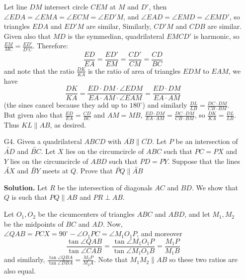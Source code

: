 \documentclass[11pt,a4paper]{article}
\begin{document}
\begin{enumerate}
    	Let line $DM$ intersect circle $CEM$ at $M$ and $D'$, 
    	then $\angle EDA = \angle EMA=\angle ECM = \angle ED'M$, 
    	and $\angle EAD=\angle EMD=\angle EMD'$, 
    	so triangles $EDA$ and $ED'M$ are similar, 
    	Similarly, $CD'M$ and $CDB$ are similar. 
    	Given also that $MD$ is the symmedian, 
    	quadrilateral $EMCD'$ is harmonic, 
    	so $\frac{EM}{MC}=\frac{ED'}{D'C}$. Therefore: 
    	\[
    	\frac{ED}{EA}=\frac{ED'}{EM}=\frac{CD'}{CM}
    	=\frac{CD}{BC}
    	\]
    	and note that the ratio $\frac{DK}{KA}$ is the ratio of area of triangles $EDM$ to $EAM$, we have 
    	\[
    	\frac{DK}{KA}=\frac{ED\cdot DM\cdot \angle EDM}{EA\cdot AM\cdot \angle EAM}=\frac{ED\cdot DM}{EA\cdot AM}
    	\]
    	(the sines cancel because they add up to $180^{\circ}$) 
    	and similarly $\frac{DL}{LB}=\frac{DC\cdot DM}{CB\cdot BM}$. 
    	But given also that $\frac{ED}{EA}=\frac{CD}{BC}$ and $AM=MB$, 
    	$\frac{ED\cdot DM}{EA\cdot AM}=\frac{DC\cdot DM}{CB\cdot BM}$, 
    	so $\frac{DK}{KA}=\frac{DL}{LB}$. 
    	Thus $KL\parallel AB$, as desired. 
    	
    	\item [G4.] 
    	Given a quadrilateral $ABCD$ with $\overline{AB}\parallel\overline{CD}$. Let $P$ be an intersection of $\overleftrightarrow{AD}$ and $\overleftrightarrow{BC}$. Let $X$ lies on the circumcircle of $ABC$ such that $PC=PX$ and $Y$ lies on the circumcircle of $ABD$ such that $PD=PY$. Suppose that the lines $\overleftrightarrow{AX}$ and $\overleftrightarrow{BY}$ meets at $Q$. Prove that $\overleftrightarrow{PQ}\parallel\overleftrightarrow{AB}$
    	
    	\textbf{Solution.} Let $R$ be the intersection of diagonals $AC$ and $BD$. 
    	We show that $Q$ is such that $PQ\parallel AB$ and $PR\perp AB$. 
    	
    	Let $O_1, O_2$ be the cicumcenters of triangles $ABC$ and $ABD$, 
    	and let $M_1, M_2$ be the midpoints of $BC$ and $AD$. 
    	Now, $\angle QAB=PCX=90^{\circ} - \angle O_1PC=\angle M_1O_1P$, and moreover 
    	\[
    	\frac{\tan\angle QAB}{\tan\angle CAB}
    	=\frac{\tan\angle M_1O_1P}{\tan\angle M_1O_1B}
    	=\frac{M_1P}{M_1B}
    	\]
    	and similarly, 
    	$\frac{\tan\angle QBA}{\tan\angle DBA}=\frac{M_2P}{M_2A}$. 
    	Note that $M_1M_2\parallel AB$ so these two ratios are also equal. 
    	

\end{enumerate}
\end{document}
